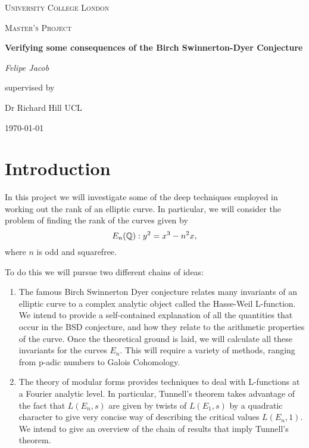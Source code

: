 \documentclass[12pt, a4paper]{report}
\begin{document}
\begin{titlepage}
	\centering
	{\scshape\LARGE University College London \par}
	\vspace{1cm}
	{\scshape\Large Master's Project \par}
	\vspace{1.5cm}
	{\huge\bfseries Verifying some consequences of the Birch Swinnerton-Dyer
    Conjecture \par}
	\vspace{2cm}
	{\Large\itshape Felipe Jacob\par}
	\vfill
	supervised by\par
	Dr Richard Hill \textsc{UCL}

	\vfill

	{\large \today\par}
\end{titlepage}


\tableofcontents
\pagebreak


\chapter{Introduction}

In this project we will investigate some of the deep techniques employed in
working out the rank of an elliptic curve. In particular, we will consider the
problem of finding the rank of the curves given by
\[E_n({\mathbb Q}) : y^2 = x^3 - n^2 x,\]
where $n$ is odd and squarefree.

To do this we will pursue two different chains of ideas:
\begin{enumerate}
\item The famous Birch Swinnerton Dyer conjecture relates many invariants of an
  elliptic curve to a complex analytic object called the Hasse-Weil L-function.
  We intend to provide a self-contained explanation of all the quantities that occur
  in the BSD conjecture, and how they relate to the arithmetic properties of the
  curve. Once the theoretical ground is laid, we will calculate all these
  invariants for the curves $E_n$.
  This will require a variety of methods, ranging from p-adic numbers to
  Galois Cohomology.
\item The theory of modular forms provides techniques to deal with L-functions at
  a Fourier analytic level. In particular, Tunnell's theorem takes advantage of
  the fact that $L(E_n,s)$ are given by twists of $L(E_1,s)$ by a quadratic
  character to give
  very concise way of describing the
  critical values $L(E_n,1).$
  We intend to give an overview of the chain of results that imply Tunnell's theorem.
\end{enumerate}
\end{document}

